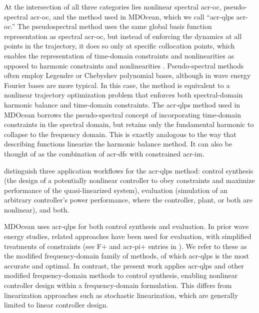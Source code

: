     At the intersection of all three categories lies nonlinear spectral \gls{acr-oc}, pseudo-spectral \gls{acr-oc}, and the method used in MDOcean, which we call ``\acrlong{acr-qlps} \gls{acr-oc}.''
    The pseudospectral method uses the same global basis function representation as spectral \gls{acr-oc}, but instead of enforcing the dynamics at all points in the trajectory, it does so only at specific collocation points, which enables the representation of time-domain constraints and nonlinearities as opposed to harmonic constraints and nonlinearities \citep{elnagar_pseudospectral_1995}.
    Pseudo-spectral methods often employ Legendre or Chebyshev polynomial bases, although in wave energy Fourier bases are more typical.
    In this case, the method is equivalent to a nonlinear trajectory optimization problem that enforces both spectral-domain harmonic balance and time-domain constraints.
    The \gls{acr-qlps} method used in MDOcean borrows the pseudo-spectral concept of incorporating time-domain constraints in the spectral domain, but retains only the fundamental harmonic to collapse to the frequency domain.
    This is exactly analogous to the way that describing functions linearize the harmonic balance method.
    It can also be thought of as the combination of \glspl{acr-df} with constrained \gls{acr-im}.
\fi

 distinguish three application workflows for the \gls{acr-qlps} method: control synthesis (the design of a potentially nonlinear controller to obey constraints and maximize performance of the quasi-linearized system), evaluation (simulation of an arbitrary controller's power performance, where the controller, plant, or both are nonlinear), and both.

MDOcean uses \gls{acr-qlps} for both control synthesis and evaluation.
In prior wave energy studies, related approaches have been used for evaluation, with simplified treatments of constraints (see F+ and \gls{acr-pi}+ entries in ).
We refer to these as the modified frequency-domain family of methods, of which \gls{acr-qlps} is the most accurate and optimal.
In contrast, the present work applies \gls{acr-qlps} and other modified frequency-domain methods to control synthesis, enabling nonlinear controller design within a frequency-domain formulation.
This differs from linearization approaches such as stochastic linearization, which are generally limited to linear controller design.

